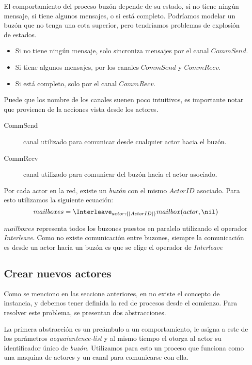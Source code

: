 El comportamiento del proceso buzón depende de su estado, si no tiene ningún mensaje, si tiene algunos mensajes, o si está completo. Podríamos modelar un buzón que no tenga una cota superior, pero tendríamos problemas de explosión de estados.

\begin{itemize}
\item Si no tiene ningún mensaje, solo sincroniza mensajes por el canal $CommSend$.
\item Si tiene algunos mensajes, por los canales $CommSend$ y $CommRecv$.
\item Si está completo, solo por el canal $CommRecv$.
\end{itemize}

Puede que los nombre de los canales suenen poco intuitivos, es importante notar que provienen de la acciones vista desde los actores.

\begin{description}
\item [CommSend] canal utilizado para comunicar desde cualquier actor hacia el buzón.
\item [CommRecv] canal utilizado para comunicar del buzón hacia el actor asociado.
\end{description}

Por cada actor en la red, existe un \textit{buzón} con el mismo $ActorID$ asociado. Para esto utilizamos la siguiente ecuación:
\[
mailboxes  = \Interleave_{actor : \{| ActorID |\} } mailbox(actor, \nil) 
\]

$mailboxes$ representa todos los buzones puestos en paralelo utilizando el operador \textit{Interleave}. Como no existe comunicación entre buzones, siempre la comunicación es desde un actor hacia un buzón es que se elige el operador de \textit{Interleave}

\subsection{Crear nuevos actores}

Como se menciono en las seccione anteriores, en \CSP no existe el concepto de instancia, y debemos tener definida la red de procesos desde el comienzo. Para resolver este problema, se presentan dos abstracciones.

La primera abstracción es un preámbulo a un comportamiento, le asigna a este de los parámetros \textit{acquaiantence-list} y al mismo tiempo el otorga al actor su identificador único de \textit{buzón}. Utilizamos para esto un proceso que funciona como una maquina de actores y un canal para comunicarse con ella.

